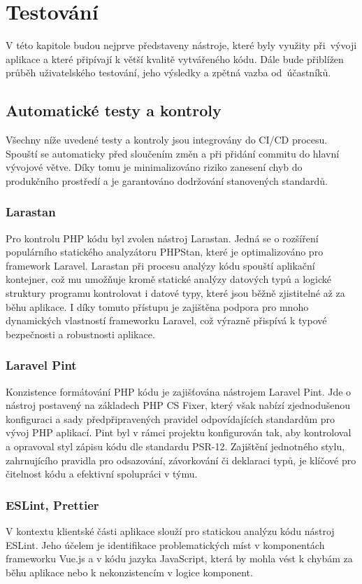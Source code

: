\chapter{Testování}
V této kapitole budou nejprve představeny nástroje, které byly využity při~vývoji aplikace a které připívají k větší kvalitě vytvářeného kódu. Dále bude přiblížen průběh uživatelského testování, jeho výsledky a zpětná vazba od~účastníků.

\section{Automatické testy a kontroly}
Všechny níže uvedené testy a kontroly jsou integrovány do CI/CD procesu. Spouští se automaticky před sloučením změn a při přidání commitu do hlavní vývojové větve. Díky tomu je minimalizováno riziko zanesení chyb do produkčního prostředí a je garantováno dodržování stanovených standardů.

\subsection{Larastan}
Pro kontrolu PHP kódu byl zvolen nástroj Larastan. Jedná se o rozšíření populárního statického analyzátoru PHPStan, které je optimalizováno pro framework Laravel. Larastan při procesu analýzy kódu spouští aplikační kontejner, což mu umožňuje kromě statické analýzy datových typů a logické struktury programu kontrolovat i datové typy, které jsou běžně zjistitelné až za běhu aplikace. I díky tomuto přístupu je zajištěna podpora pro mnoho dynamických vlastností frameworku Laravel, což výrazně přispívá k typové bezpečnosti a robustnosti aplikace. \cite{Larastan}

\subsection{Laravel Pint}
Konzistence formátování PHP kódu je zajišťována nástrojem Laravel Pint. Jde o nástroj postavený na základech PHP CS Fixer, který však nabízí zjednodušenou konfiguraci a sady předpřipravených pravidel odpovídajících standardům pro vývoj PHP aplikací. Pint byl v rámci projektu konfigurován tak, aby kontroloval a opravoval styl zápisu kódu dle standardu PSR-12. Zajištění jednotného stylu, zahrnujícího pravidla pro odsazování, závorkování či deklaraci typů, je klíčové pro čitelnost kódu a efektivní spolupráci v týmu. \cite{Pint}

\subsection{ESLint, Prettier}
V kontextu klientské části aplikace slouží pro statickou analýzu kódu nástroj ESLint. Jeho účelem je identifikace problematických míst v komponentách frameworku Vue.js a v kódu jazyka JavaScript, která by mohla vést k chybám za běhu aplikace nebo k nekonzistencím v logice komponent.

